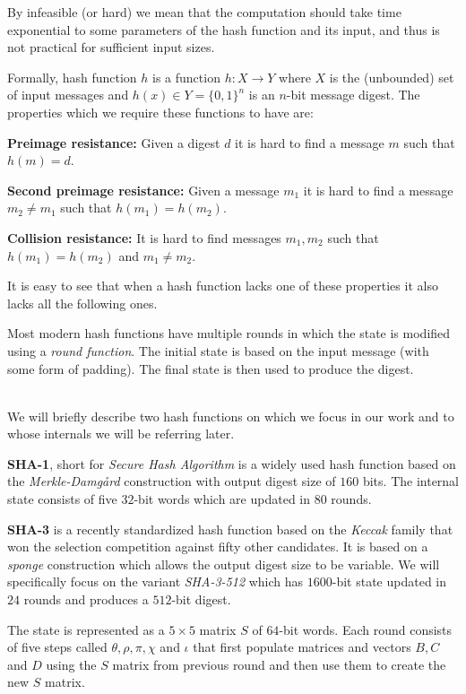 By infeasible (or hard) we mean that the computation should take time exponential to some parameters of the hash function and its input, and thus is not practical for sufficient input sizes.

Formally, hash function $h$ is a function $h: X \to Y$ where $X$ is the (unbounded) set of input messages and $h(x) \in Y = \{0,1\}^n$ is an $n$-bit message digest.
The properties which we require these functions to have are:

\textbf{Preimage resistance:} Given a digest $d$ it is hard to find a message $m$ such that $h(m) = d$.

\textbf{Second preimage resistance:} Given a message $m_1$ it is hard to find a message $m_2 \neq m_1$ such that $h(m_1) = h(m_2)$.

\textbf{Collision resistance:} It is hard to find messages $m_1,m_2$ such that $h(m_1) = h(m_2)$ and $m_1 \neq m_2$.

It is easy to see that when a hash function lacks one of these properties it also lacks all the following ones.

Most modern hash functions have multiple rounds in which the state is modified using a \emph{round function}.
The initial state is based on the input message (with some form of padding).
The final state is then used to produce the digest.

~\\

We will briefly describe two hash functions on which we focus in our work and to whose internals we will be referring later.

\textbf{SHA-1}, short for \emph{Secure Hash Algorithm} is a widely used hash function based on the \emph{Merkle-Damg\aa rd} construction with output digest size of $160$ bits.
The internal state consists of five $32$-bit words which are updated in $80$ rounds.

\textbf{SHA-3} is a recently standardized hash function based on the \emph{Keccak} family that won the selection competition against fifty other candidates.
It is based on a \emph{sponge} construction which allows the output digest size to be variable.
We will specifically focus on the variant \emph{SHA-3-512} which has $1600$-bit state updated in $24$ rounds and produces a $512$-bit digest.

The state is represented as a $5\times 5$ matrix $S$ of $64$-bit words.
Each round consists of five steps called $\theta, \rho, \pi, \chi$ and $\iota$ that first populate matrices and vectors $B, C$ and $D$ using the $S$ matrix from previous round and then use them to create the new $S$ matrix.

